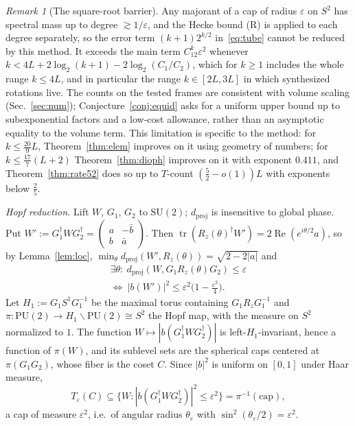 \documentclass[aps,prx,twocolumn,superscriptaddress,nofootinbib,longbibliography]{revtex4-2}
\theoremstyle{plain}
\theoremstyle{definition}
\theoremstyle{remark}
\newtheorem{remark}{Remark}
\newcommand{\dproj}{d_{\mathrm{proj}}}
\newcommand{\PU}{\mathrm{PU}(2)}
\newcommand{\SU}{\mathrm{SU}(2)}
\newcommand{\tr}{\operatorname{tr}}
\begin{document}
\begin{remark}[The square-root barrier]\label{rem:barrier}
Any majorant of a cap of radius $\varepsilon$ on $S^2$ has spectral mass up to degree $\gtrsim1/\varepsilon$, and the Hecke bound (R) is applied to each degree separately, so the error term $(k+1)2^{k/2}$ in~\eqref{eq:tube} cannot be reduced by this method. It exceeds the main term $C_12^k\varepsilon^2$ whenever $k<4L+2\log_2(k+1)-2\log_2(C_1/C_2)$, which for $k\ge1$ includes the whole range $k\le4L$, and in particular the range $k\in[2L,3L]$ in which synthesized rotations live. The counts on the tested frames are consistent with volume scaling (Sec.~\ref{sec:num}); Conjecture~\ref{conj:equid} asks for a uniform upper bound up to subexponential factors and a low-cost allowance, rather than an asymptotic equality to the volume term. This limitation is specific to the method: for $k\le\tfrac{20}9L$, Theorem~\ref{thm:elem} improves on it using geometry of numbers; for $k\le\tfrac{17}7(L+2)$ Theorem~\ref{thm:dioph} improves on it with exponent $0.411$, and Theorem~\ref{thm:rate52} does so up to $T$-count $(\tfrac52-o(1))L$ with exponents below $\tfrac25$.
\end{remark}

\emph{Hopf reduction.} Lift $W$, $G_1$, $G_2$ to $\SU$; $\dproj$ is insensitive to global phase. Put $W':=G_1^\dagger WG_2^\dagger=\begin{pmatrix}a&-\bar b\\ b&\bar a\end{pmatrix}$. Then $\tr(R_z(\theta)^\dagger W')=2\operatorname{Re}(e^{i\theta/2}a)$, so by Lemma~\ref{lem:loc}, $\min_\theta\dproj(W',R_z(\theta))=\sqrt{2-2|a|}$ and
\begin{multline}\label{eq:btube}
\exists\theta:\ \dproj(W,G_1R_z(\theta)G_2)\le\varepsilon\\
\iff\ |b(W')|^2\le\varepsilon^2\big(1-\tfrac{\varepsilon^2}4\big).
\end{multline}
Let $H_1:=G_1S^1G_1^{-1}$ be the maximal torus containing $G_1R_zG_1^{-1}$ and $\pi:\PU\to H_1\backslash\PU\cong S^2$ the Hopf map, with the measure on $S^2$ normalized to $1$. The function $W\mapsto|b(G_1^\dagger WG_2^\dagger)|$ is left-$H_1$-invariant, hence a function of $\pi(W)$, and its sublevel sets are the spherical caps centered at $\pi(G_1G_2)$, whose fiber is the coset $C$. Since $|b|^2$ is uniform on $[0,1]$ under Haar measure,
\begin{equation}
T_\varepsilon(C)\subseteq\{W:|b(G_1^\dagger WG_2^\dagger)|^2\le\varepsilon^2\}=\pi^{-1}(\mathrm{cap}),
\end{equation}
a cap of measure $\varepsilon^2$, i.e.\ of angular radius $\theta_\varepsilon$ with $\sin^2(\theta_\varepsilon/2)=\varepsilon^2$.
\end{document}
